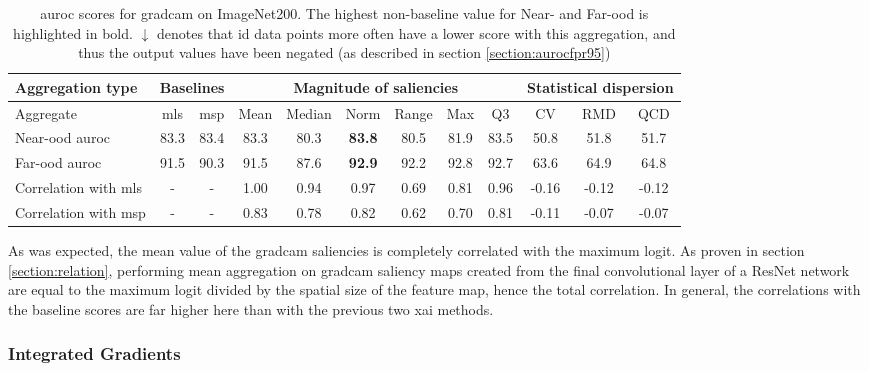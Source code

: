 \documentclass[UKenglish]{uiomasterthesis} %
\theoremstyle{definition}
\begin{document}
\begin{table}[hbtp]
\setlength\tabcolsep{3pt}
\begin{center}
\begin{tabular}{ |p{5.1em}|c c|c c c c c c|c c c| }
    \hline
     \centering Aggregation type & \multicolumn{2}{c|}{Baselines} & \multicolumn{6}{c|}{Magnitude of saliencies} & \multicolumn{3}{p{8em}|}{\centering Statistical dispersion} \\
    \hline
    Aggregate & \ac{mls} & \ac{msp} & Mean & Median & Norm & Range & Max & Q3 & CV & RMD & QCD  \\
    \hline
    \rowcolor{near!50}
    Near-\ac{ood} \ac{auroc} & 83.3 & 83.4 & 83.3 & 80.3 &\textbf{ 83.8 }& 80.5 & 81.9 & 83.5 & 50.8 & 51.8 & 51.7  \\
    \hline
    \rowcolor{far!50}
    Far-\ac{ood} \ac{auroc} & 91.5 & 90.3 & 91.5 & 87.6 &\textbf{ 92.9 }& 92.2 & 92.8 & 92.7 & 63.6 & 64.9 & 64.8  \\
    \hline
    Correlation with \ac{mls}& - & - & 1.00 & 0.94 & 0.97 & 0.69 & 0.81 & 0.96 & -0.16 & -0.12 & -0.12  \\
    \hline
    Correlation with \ac{msp}& - & - & 0.83 & 0.78 & 0.82 & 0.62 & 0.70 & 0.81 & -0.11 & -0.07 & -0.07  \\
    \hline
    \end{tabular}
    \caption[\ac{auroc} scores for \ac{gradcam} on ImageNet200]{\ac{auroc} scores for \ac{gradcam} on ImageNet200. The highest non-baseline value for Near- and Far-\ac{ood} is highlighted in bold. $\downarrow$ denotes that \ac{id} data points more often have a lower score with this aggregation, and thus the output values have been negated (as described in section \ref{section:aurocfpr95})}
    \label{table:imagenet200_gradcam_metrics}
\end{center}
\setlength\tabcolsep{6pt}
\end{table}

As was expected, the mean value of the \ac{gradcam} saliencies is completely correlated with the maximum logit. As proven in section \ref{section:relation}, performing mean aggregation on \ac{gradcam} saliency maps created from the final convolutional layer of a ResNet network are equal to the maximum logit divided by the spatial size of the feature map, hence the total correlation. In general, the correlations with the baseline scores are far higher here than with the previous two \ac{xai} methods.

\subsubsection{Integrated Gradients}
\end{document}
